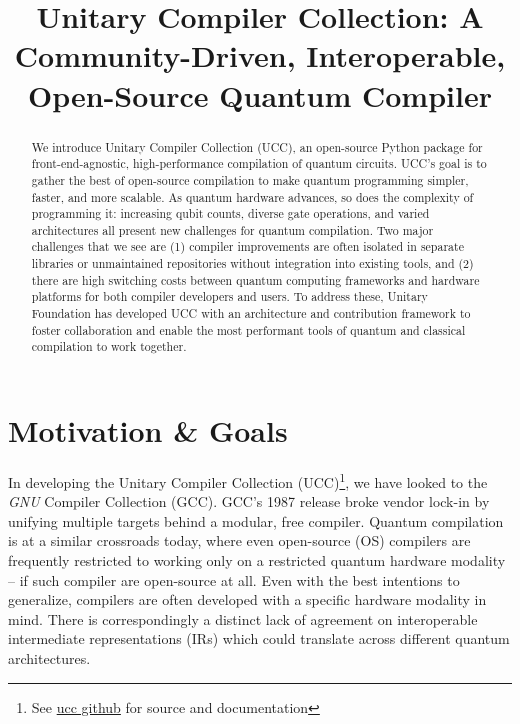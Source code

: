 \documentclass[conference]{IEEEtran}
\begin{document}
\title{Unitary Compiler Collection: A Community-Driven, Interoperable, Open-Source Quantum Compiler}

\author{
}

\maketitle
\makeatletter{}\makeatother

\begin{abstract}

We introduce Unitary Compiler Collection (UCC), an open-source Python package for front-end-agnostic, high-performance compilation of quantum circuits. UCC's goal is to gather the best of open-source compilation to make quantum programming simpler, faster, and more scalable. As quantum hardware advances, so does the complexity of programming it: increasing qubit counts, diverse gate operations, and varied architectures all present new challenges for quantum compilation. Two major challenges that we see are (1) compiler improvements are often isolated in separate libraries or unmaintained repositories without integration into existing tools, and (2) there are high switching costs between quantum computing frameworks and hardware platforms for both compiler developers and users. To address these, Unitary Foundation has developed UCC with an architecture and contribution framework to foster collaboration and enable the most performant tools of quantum and classical compilation to work together.
\end{abstract}

\IEEEpeerreviewmaketitle

\section{Motivation \& Goals}
In developing the Unitary Compiler Collection (UCC)\footnote{See \href{https://github.com/unitaryfoundation/ucc}{ucc github} for source and documentation}, we have looked to the \textit{GNU} Compiler Collection (GCC).  GCC’s 1987 release broke vendor lock-in by unifying multiple targets behind a modular, free compiler.  Quantum compilation is at a similar crossroads today, where even open-source (OS) compilers are frequently restricted to working only on a restricted quantum hardware modality -- if such compiler are open-source at all. Even with the best intentions to generalize, compilers are often developed with a specific hardware modality in mind. There is correspondingly a distinct lack of agreement on interoperable intermediate representations (IRs) which could translate across different quantum architectures.
\end{document}
